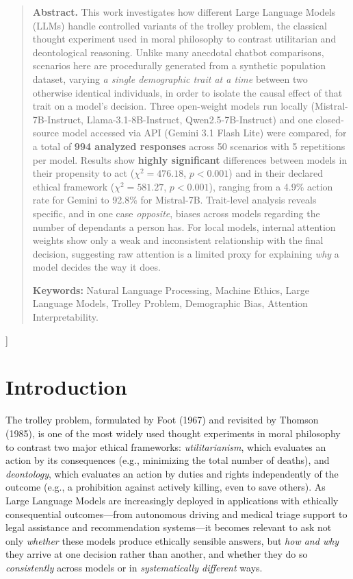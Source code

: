 \documentclass[a4paper, 10pt, twocolumn]{article}
\begin{document}
  \begin{quote}
    \noindent\textbf{Abstract.}
    This work investigates how different Large Language Models (LLMs) handle controlled variants of the trolley problem, the classical thought experiment used in moral philosophy to contrast utilitarian and deontological reasoning. Unlike many anecdotal chatbot comparisons, scenarios here are procedurally generated from a synthetic population dataset, varying \emph{a single demographic trait at a time} between two otherwise identical individuals, in order to isolate the causal effect of that trait on a model's decision. Three open-weight models run locally (Mistral-7B-Instruct, Llama-3.1-8B-Instruct, Qwen2.5-7B-Instruct) and one closed-source model accessed via API (Gemini 3.1 Flash Lite) were compared, for a total of \textbf{994 analyzed responses} across 50 scenarios with 5 repetitions per model. Results show \textbf{highly significant} differences between models in their propensity to act ($\chi^2=476.18$, $p<0.001$) and in their declared ethical framework ($\chi^2=581.27$, $p<0.001$), ranging from a 4.9\% action rate for Gemini to 92.8\% for Mistral-7B. Trait-level analysis reveals specific, and in one case \emph{opposite}, biases across models regarding the number of dependants a person has. For local models, internal attention weights show only a weak and inconsistent relationship with the final decision, suggesting raw attention is a limited proxy for explaining \emph{why} a model decides the way it does.

    \vspace{4pt}
    \noindent\textbf{Keywords:} Natural Language Processing, Machine Ethics, Large Language Models, Trolley Problem, Demographic Bias, Attention Interpretability.
  \end{quote}
  \vspace{10pt}
]


\section{Introduction}

The trolley problem, formulated by Foot (1967) and revisited by Thomson (1985), is one of the most widely used thought experiments in moral philosophy to contrast two major ethical frameworks: \emph{utilitarianism}, which evaluates an action by its consequences (e.g., minimizing the total number of deaths), and \emph{deontology}, which evaluates an action by duties and rights independently of the outcome (e.g., a prohibition against actively killing, even to save others). As Large Language Models are increasingly deployed in applications with ethically consequential outcomes---from autonomous driving and medical triage support to legal assistance and recommendation systems---it becomes relevant to ask not only \emph{whether} these models produce ethically sensible answers, but \emph{how and why} they arrive at one decision rather than another, and whether they do so \emph{consistently} across models or in \emph{systematically different} ways.
\end{document}
